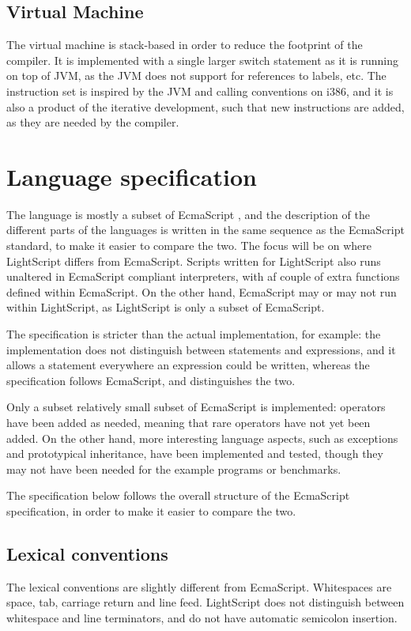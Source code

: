 \documentclass[11pt]{report}
\begin{document}
\subsection{Virtual Machine}
The virtual machine is stack-based in order to reduce the footprint of the compiler.
It is implemented with a single larger switch statement as it is running on top of JVM, as the JVM does not support for references to labels, etc.
The instruction set is inspired by the JVM and calling conventions on i386, and it is also a product of the iterative development, such that new instructions are added, as they are needed by the compiler.


\section{Language specification}
The language is mostly a subset of EcmaScript \cite{ecma-262}, and the description of the different parts of the languages is written in the same sequence as the EcmaScript standard, to make it easier to compare the two. The focus will be on where LightScript differs from EcmaScript.
Scripts written for LightScript also runs unaltered in EcmaScript compliant interpreters, with af couple of extra functions defined within EcmaScript. On the other hand, EcmaScript may or may not run within LightScript, as LightScript is only a subset of EcmaScript.

The specification is stricter than the actual implementation, for example: the implementation does not distinguish between statements and expressions, and it allows a statement everywhere an expression could be written, whereas the specification follows EcmaScript, and distinguishes the two.

Only a subset relatively small subset of EcmaScript is implemented: operators have been added as needed, meaning that rare operators have not yet been added. 
On the other hand, more interesting language aspects, such as exceptions and prototypical inheritance, have been implemented and tested, though they may not have been needed for the example programs or benchmarks.

The specification below follows the overall structure of the EcmaScript specification, in order to make it easier to compare the two.


\subsection{Lexical conventions}
The lexical conventions are slightly different from EcmaScript. 
Whitespaces are space, tab, carriage return and line feed. 
LightScript does not distinguish between whitespace and line terminators, and do not have automatic semicolon insertion.
\end{document}
